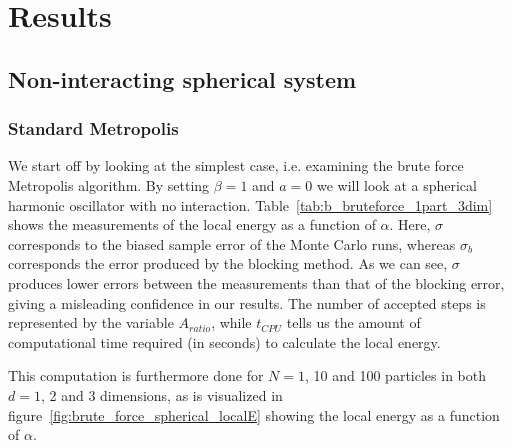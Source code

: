 \documentclass[
    a4paper, aps, twocolumn, floatfix, superscriptaddress,
    nofootinbib]{revtex4-1}
\begin{document}
\section{Results}\label{sec:Results}
\subsection{Non-interacting spherical system}
\subsubsection{Standard Metropolis}
We start off by looking at the simplest case, i.e. examining the brute force Metropolis algorithm. By setting $\beta = 1$ and $a=0$ we will look at a spherical harmonic oscillator with no interaction. Table~\ref{tab:b_bruteforce_1part_3dim} shows the measurements of the local energy as a function of $\alpha$. Here, $\sigma$ corresponds to the biased sample error of the Monte Carlo runs, whereas $\sigma_b$ corresponds the error produced by the blocking method. As we can see, $\sigma$ produces lower errors between the measurements than that of the blocking error, giving a misleading confidence in our results. The number of accepted steps is represented by the variable $A_{ratio}$, while $t_{CPU}$ tells us the amount of computational time required (in seconds) to calculate the local energy.

This computation is furthermore done for $N = 1$, 10 and 100 particles in both $d = 1$, 2 and 3 dimensions, as is visualized in figure~\ref{fig:brute_force_spherical_localE} showing the local energy as a function of $\alpha$.


\end{document}
